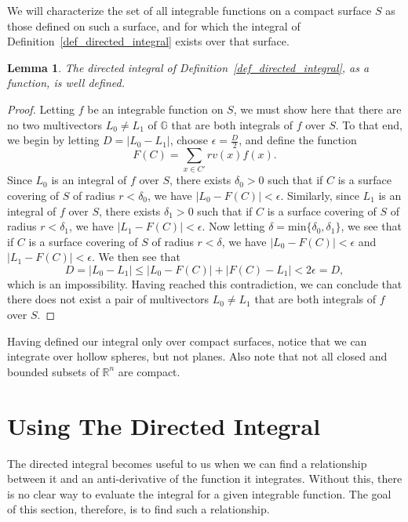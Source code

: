 \documentclass[12pt]{article}
\numberwithin{equation}{section}
\newcommand{\G}{\mathbb{G}}
\newcommand{\R}{\mathbb{R}}
\newtheorem{lemma}{Lemma}[section]
\begin{document}
We will characterize the set of all integrable functions on a compact surface $S$ as those defined
on such a surface, and for which
the integral of Definition~\ref{def_directed_integral} exists over that surface.

\begin{lemma}
The directed integral of Definition~\ref{def_directed_integral}, as a function, is well defined.
\end{lemma}
\begin{proof}
Letting $f$ be an integrable function on $S$, we must show here that there
are no two multivectors $L_0\neq L_1$ of $\G$ that are both integrals of $f$ over $S$.
To that end, we begin by letting $D=|L_0-L_1|$, choose $\epsilon = \frac{D}{2}$,
and define the function
\begin{equation*}
F(C) = \sum_{x\in C'}rv(x)f(x).
\end{equation*}
Since $L_0$ is an integral of $f$ over $S$, there exists $\delta_0>0$ such that
if $C$ is a surface covering of $S$ of radius $r<\delta_0$, we have $|L_0-F(C)|<\epsilon$.
Similarly, since $L_1$ is an integral of $f$ over $S$, there exists $\delta_1>0$ such that
if $C$ is a surface covering of $S$ of radius $r<\delta_1$, we have $|L_1-F(C)|<\epsilon$.
Now letting $\delta=\mbox{min}\{\delta_0,\delta_1\}$, we see that if $C$ is a surface
covering of $S$ of radius $r<\delta$, we have $|L_0-F(C)|<\epsilon$ and $|L_1-F(C)|<\epsilon$.
We then see that
\begin{equation*}
D = |L_0-L_1|\leq |L_0-F(C)|+|F(C)-L_1|<2\epsilon = D,
\end{equation*}
which is an impossibility.  Having reached this contradiction, we can conclude that there
does not exist a pair of multivectors $L_0\neq L_1$ that are both integrals of $f$ over $S$.
\end{proof}

Having defined our integral only over compact surfaces, notice that we can
integrate over hollow spheres, but not planes.  Also note that not all closed
and bounded subsets of $\R^n$ are compact.

\section{Using The Directed Integral}

The directed integral becomes useful to us when we can find a relationship between it
and an anti-derivative of the function it integrates.  Without this, there is no clear way
to evaluate the integral for a given integrable function.  The goal of this section, therefore,
is to find such a relationship.
\end{document}

